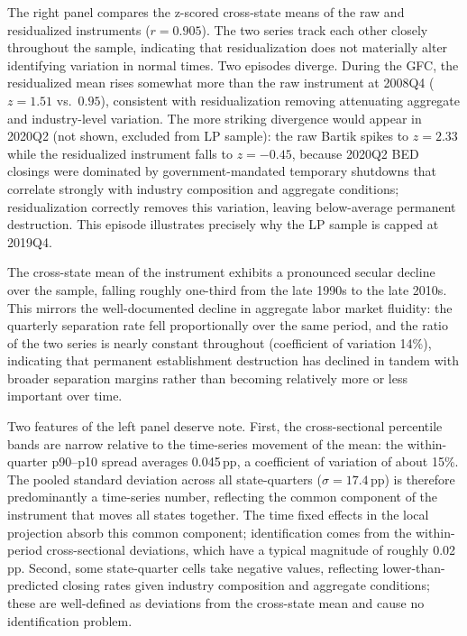 \documentclass[authoryear, review, 12pt]{elsarticle}
\begin{document}
	The right panel compares the z-scored cross-state means of the raw
	and residualized instruments ($r = 0.905$).  The two series track
	each other closely throughout the sample, indicating that
	residualization does not materially alter identifying variation in
	normal times.  Two episodes diverge.  During the GFC, the
	residualized mean rises somewhat more than the raw instrument at
	2008Q4 ($z = 1.51$ vs.\ $0.95$), consistent with residualization
	removing attenuating aggregate and industry-level variation.  The
	more striking divergence would appear in 2020Q2 (not shown, excluded
	from LP sample): the raw Bartik spikes to $z = 2.33$ while the
	residualized instrument falls to $z = -0.45$, because 2020Q2 BED
	closings were dominated by government-mandated temporary shutdowns
	that correlate strongly with industry composition and aggregate
	conditions; residualization correctly removes this variation, leaving
	below-average permanent destruction.  This episode illustrates
	precisely why the LP sample is capped at 2019Q4.

	The cross-state mean of the instrument exhibits a pronounced secular
	decline over the sample, falling roughly one-third from the late
	1990s to the late 2010s.  This mirrors the well-documented decline in
	aggregate labor market fluidity: the \citet{shimer_2005} quarterly
	separation rate fell proportionally over the same period, and the
	ratio of the two series is nearly constant throughout (coefficient of
	variation 14\%), indicating that permanent establishment destruction
	has declined in tandem with broader separation margins rather than
	becoming relatively more or less important over time.

	Two features of the left panel deserve note.  First, the
	cross-sectional percentile bands are narrow relative to the
	time-series movement of the mean: the within-quarter p90--p10 spread
	averages 0.045\,pp, a coefficient of variation of about 15\%.  The
	pooled standard deviation across all state-quarters ($\hat{\sigma} =
	17.4$\,pp) is therefore predominantly a time-series number, reflecting
	the common component of the instrument that moves all states together.
	The time fixed effects in the local projection absorb this common
	component; identification comes from the within-period cross-sectional
	deviations, which have a typical magnitude of roughly 0.02\,pp.
	Second, some state-quarter cells take negative values, reflecting
	lower-than-predicted closing rates given industry composition and
	aggregate conditions; these are well-defined as deviations from the
	cross-state mean and cause no identification problem.
\end{document}
